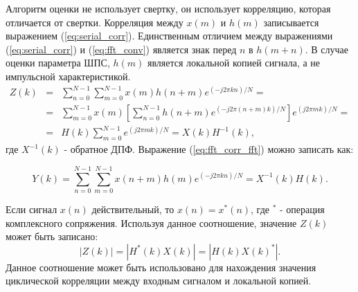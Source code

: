 Алгоритм оценки не использует свертку, он использует корреляцию, которая отличается от свертки. Корреляция
между $x(m)$ и $h(m)$ записывается выражением (\ref{eq:serial_corr}).
Единственным отличием между выражениями (\ref{eq:serial_corr}) и (\ref{eq:fft_conv}) является знак перед $n$ в ${h(m+n)}$.
В случае оценки параметра ШПС, $h(m)$ является локальной копией сигнала, а не импульсной характеристикой.
\begin{eqnarray}
	\label{eq:fft_corr_fft}
	Z(k) & = & \sum\limits_{n=0}^{N-1}\sum\limits_{m=0}^{N-1}{x(m)h(n+m)e^{(-j2\pi{kn})/N}}=\nonumber \\
	& = & \sum\limits_{m=0}^{N-1}{x(m)}[\sum\limits_{n=0}^{N-1}h(n+m)e^{(-j2\pi{(n+m)}k)/N}]e^{(j2\pi{m}k)/N}=\\
	& = & H(k)\sum\limits_{m=0}^{N-1}e^{(j2\pi{m}k)/N} = X(k)H^{-1}(k)\nonumber,
\end{eqnarray}
где ${X^{-1}(k)}$ - обратное ДПФ. Выражение (\ref{eq:fft_corr_fft}) можно записать как:

\begin{equation}
	\label{eq:fft_corr_fft_rev}
	Y(k) = \sum\limits_{n=0}^{N-1}\sum\limits_{m=0}^{N-1}{x(n+m)h(m)e^{(-j2\pi{kn})/N}}=X^{-1}(k)H(k).
\end{equation}

Если сигнал $x(n)$ действительный, то $x(n) = x^*(n)$, где ${^*}$ - операция комплексного сопряжения. Используя данное соотношение,
значение $Z(k)$ может быть записано:
\begin{equation}
	\label{eq:fft_magnitude}
	|Z(k)|=|H^*(k)X(k)|=|H(k)X(k)^*|.
\end{equation}
Данное соотношение может быть использовано для нахождения значения циклической корреляции между входным сигналом и 
локальной копией.

